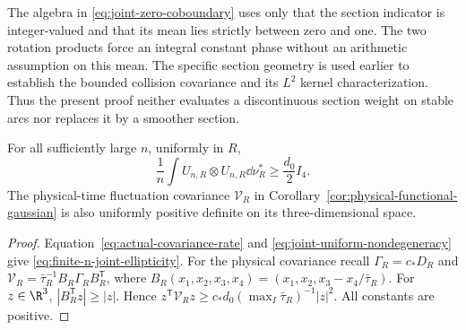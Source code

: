 \begin{remark}
The algebra in \eqref{eq:joint-zero-coboundary} uses only that the
section indicator is integer-valued and that its mean lies strictly
between zero and one. The two rotation products force an integral
constant phase without an arithmetic assumption on this mean. The
specific section geometry is used earlier to establish the bounded
collision covariance and its $L^2$ kernel characterization. Thus the
present proof neither evaluates a discontinuous section weight on
stable arcs nor replaces it by a smoother section.
\end{remark}

\begin{corollary}
\label{cor:actual-uniform-ellipticity}
For all sufficiently large $n$, uniformly in $R$,
\begin{equation}\label{eq:finite-n-joint-ellipticity}
 \frac1n\int U_{n,R}\otimes U_{n,R}\dd\nu_R^*
       \ge\frac{d_0}{2}I_4.
\end{equation}
The physical-time fluctuation covariance $\mathcal V_R$ in
Corollary~\ref{cor:physical-functional-gaussian} is also uniformly
positive definite on its three-dimensional space.
\end{corollary}
\begin{proof}
Equation~\eqref{eq:actual-covariance-rate} and
\eqref{eq:joint-uniform-nondegeneracy} give
\eqref{eq:finite-n-joint-ellipticity}. For the physical covariance recall
$\Gamma_R=c_*D_R$ and
$\mathcal V_R=\bar\tau_R^{-1}B_R\Gamma_RB_R^{\mathsf T}$, where
$B_R(x_1,x_2,x_3,x_4)=(x_1,x_2,x_3-x_4/\bar\tau_R)$.
For $z\in\R^3$, $|B_R^{\mathsf T}z|\ge|z|$. Hence
$z^{\mathsf T}\mathcal V_Rz\ge
 c_*d_0(\max_I\bar\tau_R)^{-1}|z|^2$. All constants are positive.
\end{proof}

